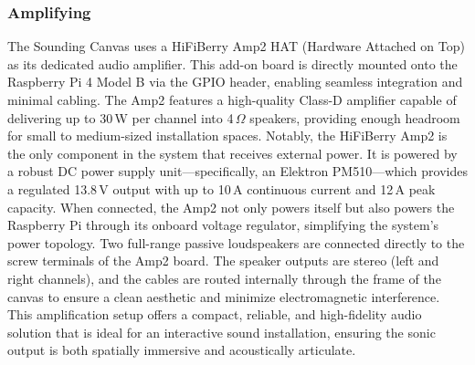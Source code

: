 \documentclass{article}
\begin{document}
\subsubsection{Amplifying}
The Sounding Canvas uses a HiFiBerry Amp2 HAT (Hardware Attached on Top) as its dedicated audio amplifier. This add-on board is directly mounted onto the Raspberry Pi 4 Model B via the GPIO header, enabling seamless integration and minimal cabling. The Amp2 features a high-quality Class-D amplifier capable of delivering up to 30\,W per channel into 4\,$\Omega$ speakers, providing enough headroom for small to medium-sized installation spaces. \newline 
Notably, the HiFiBerry Amp2 is the only component in the system that receives external power. It is powered by a robust DC power supply unit—specifically, an Elektron PM510—which provides a regulated 13.8\,V output with up to 10\,A continuous current and 12\,A peak capacity. When connected, the Amp2 not only powers itself but also powers the Raspberry Pi through its onboard voltage regulator, simplifying the system’s power topology. \newline
Two full-range passive loudspeakers are connected directly to the screw terminals of the Amp2 board. The speaker outputs are stereo (left and right channels), and the cables are routed internally through the frame of the canvas to ensure a clean aesthetic and minimize electromagnetic interference. \newline 
This amplification setup offers a compact, reliable, and high-fidelity audio solution that is ideal for an interactive sound installation, ensuring the sonic output is both spatially immersive and acoustically articulate.
\end{document}

